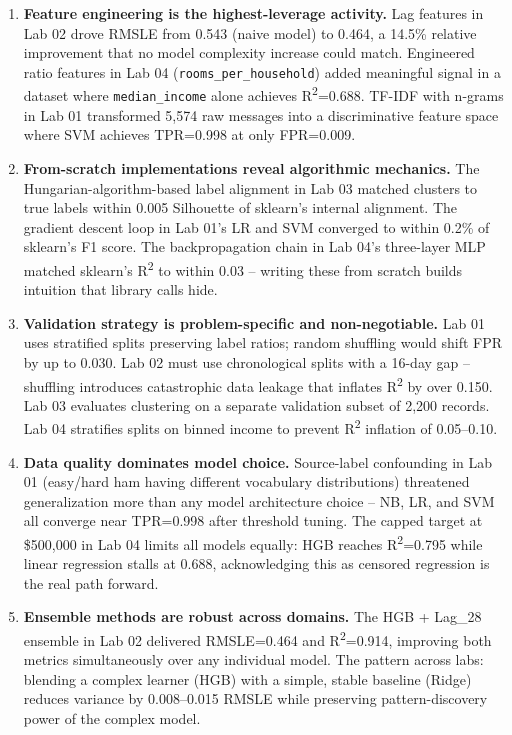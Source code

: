 \begin{enumerate}
  \item \textbf{Feature engineering is the highest-leverage activity.} Lag features in Lab 02 drove RMSLE from 0.543 (naive model) to 0.464, a 14.5\% relative improvement that no model complexity increase could match. Engineered ratio features in Lab 04 (\texttt{rooms\_per\_household}) added meaningful signal in a dataset where \texttt{median\_income} alone achieves R\textsuperscript{2}=0.688. TF-IDF with n-grams in Lab 01 transformed 5,574 raw messages into a discriminative feature space where SVM achieves TPR=0.998 at only FPR=0.009.

  \item \textbf{From-scratch implementations reveal algorithmic mechanics.} The Hungarian-algorithm-based label alignment in Lab 03 matched clusters to true labels within 0.005 Silhouette of sklearn's internal alignment. The gradient descent loop in Lab 01's LR and SVM converged to within 0.2\% of sklearn's F1 score. The backpropagation chain in Lab 04's three-layer MLP matched sklearn's R\textsuperscript{2} to within 0.03 -- writing these from scratch builds intuition that library calls hide.

  \item \textbf{Validation strategy is problem-specific and non-negotiable.} Lab 01 uses stratified splits preserving label ratios; random shuffling would shift FPR by up to 0.030. Lab 02 must use chronological splits with a 16-day gap -- shuffling introduces catastrophic data leakage that inflates R\textsuperscript{2} by over 0.150. Lab 03 evaluates clustering on a separate validation subset of 2,200 records. Lab 04 stratifies splits on binned income to prevent R\textsuperscript{2} inflation of 0.05--0.10.

  \item \textbf{Data quality dominates model choice.} Source-label confounding in Lab 01 (easy/hard ham having different vocabulary distributions) threatened generalization more than any model architecture choice -- NB, LR, and SVM all converge near TPR=0.998 after threshold tuning. The capped target at \$500,000 in Lab 04 limits all models equally: HGB reaches R\textsuperscript{2}=0.795 while linear regression stalls at 0.688, acknowledging this as censored regression is the real path forward.

  \item \textbf{Ensemble methods are robust across domains.} The HGB + Lag\_28 ensemble in Lab 02 delivered RMSLE=0.464 and R\textsuperscript{2}=0.914, improving both metrics simultaneously over any individual model. The pattern across labs: blending a complex learner (HGB) with a simple, stable baseline (Ridge) reduces variance by 0.008--0.015 RMSLE while preserving pattern-discovery power of the complex model.


\end{enumerate}
